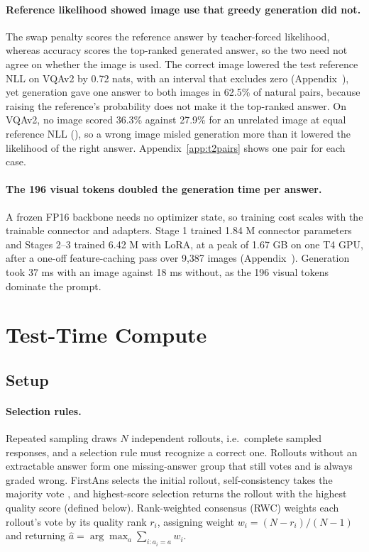 \documentclass{article}
\newcommand{\tablebody}[1]{\small\setlength{\tabcolsep}{4pt}}
\begin{document}
\begin{table}[t]
  \centering
  \caption{Final-test accuracy (normalized exact match for annotation-derived pairs, VQA soft accuracy for VQAv2), pair accuracy and reference NLL under four image conditions.}
  \label{tab:t2}
  \tablebody{tables/t2_main.tex}
\end{table}

\paragraph{Reference likelihood showed image use that greedy generation did not.}
The swap penalty scores the reference answer by teacher-forced likelihood, whereas accuracy scores the top-ranked generated answer, so the two need not agree on whether the image is used. The correct image lowered the test reference NLL on VQAv2 by 0.72 nats, with an interval that excludes zero (Appendix~), yet generation gave one answer to both images in 62.5\% of natural pairs, because raising the reference's probability does not make it the top-ranked answer. On VQAv2, no image scored 36.3\% against 27.9\% for an unrelated image at equal reference NLL (), so a wrong image misled generation more than it lowered the likelihood of the right answer. Appendix~\ref{app:t2pairs} shows one pair for each case.

\paragraph{The 196 visual tokens doubled the generation time per answer.}
A frozen FP16 backbone needs no optimizer state, so training cost scales with the trainable connector and adapters. Stage 1 trained 1.84 M connector parameters and Stages 2--3 trained 6.42 M with LoRA, at a peak of 1.67 GB on one T4 GPU, after a one-off feature-caching pass over 9,387 images (Appendix~). Generation took 37 ms with an image against 18 ms without, as the 196 visual tokens dominate the prompt.

\section{Test-Time Compute}
\label{sec:t3}
\subsection{Setup}
\paragraph{Selection rules.} Repeated sampling draws $N$ independent rollouts, i.e.\ complete sampled responses, and a selection rule must recognize a correct one. Rollouts without an extractable answer form one missing-answer group that still votes and is always graded wrong. FirstAns selects the initial rollout, self-consistency takes the majority vote \citep{selfconsistency}, and highest-score selection returns the rollout with the highest quality score (defined below). Rank-weighted consensus (RWC) weights each rollout's vote by its quality rank $r_i$, assigning weight $w_i=(N-r_i)/(N-1)$ and returning $\hat a=\arg\max_a\sum_{i:a_i=a}w_i$.
\end{document}

